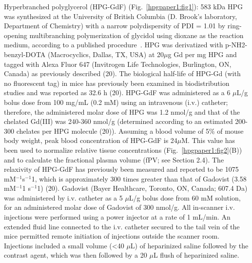 Hyperbranched polyglycerol (HPG-GdF) (Fig.~\ref{hpgpaper1:fig1}): 583 kDa HPG was synthesized at the University of British Columbia (D. Brook’s laboratory, Department of Chemistry) with a narrow polydispersity of PDI = 1.01 by ring-opening multibranching polymerization of glycidol using dioxane as the reaction medium, according to a published procedure~\cite{Kainthan:2006ce}.
HPG was derivatized with p-NH2-benzyl-DOTA (Macrocyclics, Dallas, TX, USA) at 20$\mu$g Gd per mg HPG and tagged with Alexa Fluor 647 (Invitrogen Life Technologies, Burlington, ON, Canada) as previously described (20).
The biological half-life of HPG-Gd (with no fluorescent tag) in mice has previously been examined in biodistribution studies and was reported as 32.6 h (20).
HPG-GdF was administered as a 6 $\mu$L/g bolus dose from 100 mg/mL (0.2 mM) using an intravenous (i.v.) catheter; therefore, the administered molar dose of HPG was 1.2 nmol/g and that of the chelated Gd(III) was 240-360 nmol/g (determined according to an estimated 200-300 chelates per HPG molecule (20)).
Assuming a blood volume of 5\% of mouse body weight, peak blood concentration of \ac{HPG-GdF} is 24$\mu$M.
This value has been used to normalize relative tissue concentrations (Fig.~\ref{hpgpaper1:fig2}(B)) and to calculate the fractional plasma volume (fPV; see Section 2.4).
The relaxivity of \ac{HPG-GdF} has previously been measured and reported to be 1075 mM$^{-1}$s$^{-1}$1, which is approximately 300 times greater than that of Gadovist (3.58 mM$^{-1}$1 s$^{-1}$1) (20).
Gadovist (Bayer Healthcare, Toronto, ON, Canada; 607.4 Da) was administered by i.v. catheter as a 5 $\mu$L/g bolus dose from 60 mM solution, for an administered molar dose of Gadovist of 300 nmol/g.
All in-scanner i.v. injections were performed using a power injector at a rate of 1 mL/min.
An extended fluid line connected to the i.v. catheter secured to the tail vein of the mice permitted remote initiation of injections outside the scanner room.
Injections included a small volume (<40 $\mu$L) of heparinized saline followed by the contrast agent, which was then followed by a 20 $\mu$L flush of heparinized saline.

